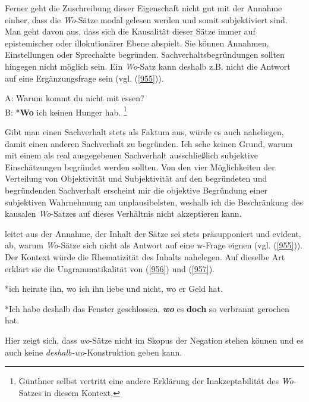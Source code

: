 {Ferner geht die Zuschreibung dieser Eigenschaft nicht gut mit der Annahme einher, dass die \textit{Wo}-Sätze modal gelesen werden und somit subjektiviert sind. Man geht davon aus, dass sich die Kausalität dieser Sätze immer auf epistemi\-scher oder illokutionärer Ebene abspielt. Sie können Annahmen, Einstellungen oder Sprechakte begründen. Sachverhaltsbegründungen sollten hingegen nicht möglich sein. Ein \textit{Wo}-Satz kann deshalb z.B. nicht die Antwort auf eine Ergänzungsfrage sein (vgl. (\ref{955})).

\begin{exe}
	\ex\label{955}
	A: Warum kommt du nicht mit essen?\\
	B: *\textbf{Wo} ich keinen Hunger hab.	 			      
	\hfill\hbox{\citet[325]{Guenthner2002}}\footnote{Günthner selbst vertritt eine andere Erklärung der Inakzeptabilität des \textit{Wo}-Satzes in diesem 		Kontext.}
\end{exe} 
Gibt man einen Sachverhalt stets als Faktum aus, würde es auch naheliegen, damit einen anderen Sachverhalt zu begründen. Ich sehe keinen Grund, warum mit einem als real ausgegebenen Sachverhalt ausschließlich subjektive Einschätzungen begründet werden sollten. Von den vier Möglichkeiten der Verteilung von Objektivität und Subjektivität auf den begründeten und begründenden Sachverhalt erscheint mir die objektive Begründung einer subjektiven Wahrnehmung am unplausibelsten, weshalb ich die Beschränkung des kausalen \textit{Wo}-Satzes auf dieses Verhältnis nicht akzeptieren kann.

\citet{Guenthner2002} leitet aus der Annahme, der Inhalt der Sätze sei stets präsupponiert und evident, ab, warum \textit{Wo}-Sätze sich nicht als Antwort auf eine w-Frage eignen (vgl. (\ref{955})). Der Kontext würde die Rhematizität des Inhalts nahelegen. Auf dieselbe Art erklärt sie die Ungrammatikalität von (\ref{956}) und (\ref{957}).

\begin{exe}
	\ex\label{956}
	*ich heirate ihn, wo ich ihn liebe und nicht, wo er Geld hat.
	\newline 	 			      
	\hbox{}\hfill\hbox{\citet[325]{Guenthner2002}}
\end{exe}
\vspace{-0.65cm}
\begin{exe}
	\ex\label{957}
	*Ich habe deshalb das Fenster geschlossen, \textbf{\textit{wo}} es \textbf{doch} so verbrannt gerochen hat. 			      
\end{exe}
Hier zeigt sich, dass \textit{wo}-Sätze nicht im Skopus der Negation stehen können und es auch keine \textit{deshalb-wo}-Konstruktion geben kann.

}
